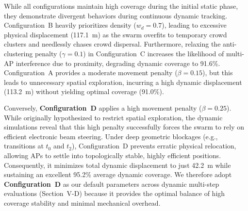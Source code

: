 While all configurations maintain high coverage during the initial static phase, they demonstrate divergent behaviors during continuous dynamic tracking. Configuration~B heavily prioritizes density ($w_d=0.7$), leading to excessive physical displacement (117.1~m) as the swarm overfits to temporary crowd clusters and needlessly chases crowd dispersal. Furthermore, relaxing the anti-clustering penalty ($\gamma=0.1$) in Configuration~C increases the likelihood of multi-AP interference due to proximity, degrading dynamic coverage to 91.6\%. Configuration~A provides a moderate movement penalty ($\beta=0.15$), but this leads to unnecessary spatial exploration, incurring a high dynamic displacement (113.2~m) without yielding optimal coverage (91.0\%).

Conversely, \textbf{Configuration~D} applies a high movement penalty ($\beta = 0.25$). While originally hypothesized to restrict spatial exploration, the dynamic simulations reveal that this high penalty successfully forces the swarm to rely on efficient electronic beam steering. Under deep geometric blockages (e.g., transitions at $t_0$ and $t_2$), Configuration~D prevents erratic physical relocation, allowing APs to settle into topologically stable, highly efficient positions. Consequently, it minimizes total dynamic displacement to just 42.2~m while sustaining an excellent 95.2\% average dynamic coverage. We therefore adopt \textbf{Configuration~D} as our default parameters across dynamic multi-step evaluations (Section~V-D) because it provides the optimal balance of high coverage stability and minimal mechanical overhead.
